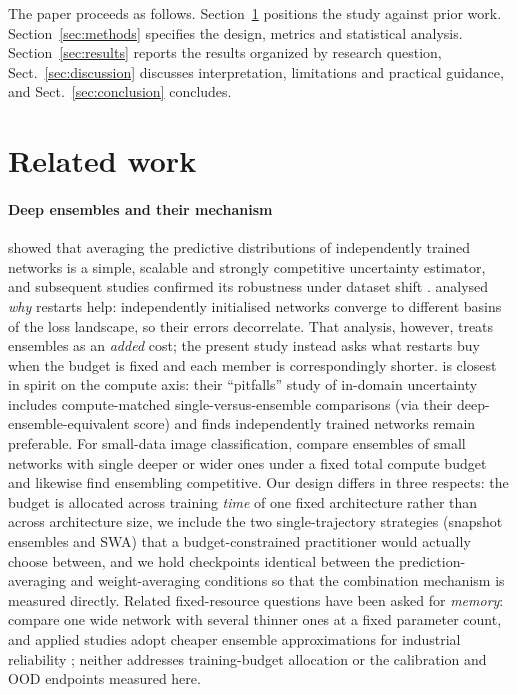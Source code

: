 \documentclass[11pt,a4paper]{article}
\newcommand{\swa}{\textsc{SWA}}
\begin{document}
The paper proceeds as follows. Section~\ref{sec:related} positions the study
against prior work. Section~\ref{sec:methods} specifies the design,
metrics and statistical analysis. Section~\ref{sec:results} reports the
results organized by research question, Sect.~\ref{sec:discussion} discusses
interpretation, limitations and practical guidance, and
Sect.~\ref{sec:conclusion} concludes.

\section{Related work}\label{sec:related}

\paragraph{Deep ensembles and their mechanism}
\citet{lakshminarayanan2017} showed that averaging the predictive
distributions of independently trained networks is a simple, scalable and
strongly competitive uncertainty estimator, and subsequent studies confirmed
its robustness under dataset shift \citep{ovadia2019}.
\citet{fort2019} analysed \emph{why} restarts help: independently
initialised networks converge to different basins of the loss landscape, so
their errors decorrelate. That analysis, however, treats ensembles as an
\emph{added} cost; the present study instead asks what restarts buy when
the budget is fixed and each member is correspondingly shorter.
\citet{ashukha2020} is closest in spirit on the compute axis: their
``pitfalls'' study of in-domain uncertainty includes compute-matched
single-versus-ensemble comparisons (via their deep-ensemble-equivalent
score) and finds independently trained networks remain preferable. For
small-data image classification, \citet{brigato2021} compare ensembles of
small networks with single deeper or wider ones under a fixed total
compute budget and likewise find ensembling competitive. Our design
differs in three respects: the budget is allocated across training
\emph{time} of one fixed architecture rather than across architecture size,
we include the two single-trajectory strategies (snapshot
ensembles and \swa) that a budget-constrained practitioner would actually
choose between, and we hold checkpoints identical between the
prediction-averaging and weight-averaging conditions so that the combination
mechanism is measured directly. Related fixed-resource questions have been
asked for \emph{memory}: \citet{chirkova2020} compare one wide network with
several thinner ones at a fixed parameter count, and applied studies adopt
cheaper ensemble approximations for industrial reliability
\citep{thuy2024}; neither addresses training-budget allocation or the
calibration and OOD endpoints measured here.
\end{document}
